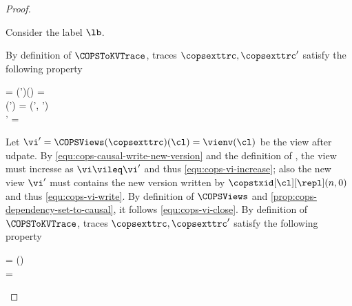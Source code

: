 \begin{proof}
\begin{enumerate}
    Consider the label \( \lb \).
    \begin{enumerate}
    \Case{\( \lb = \lbTrans{\vi,\Set{\opW(\key,\val)}}\)}
        By definition of \( \COPSToKVTrace \), traces \( \copsexttrc, \copsexttrc' \) satisfy the following property
        \begin{Formulae}
        \begin{Formula}
        \begin{multlined}
            \vi = \COPSViews(\copsexttrc')(\cl) 
            \land \copsexttrc = 
            \\ {} \land \LastConf(\copsexttrc') = (\cops', \copsctxenv')
            \\ {} \land \copsctxenv' = \copsctxenv{}
        \end{multlined}
        \label{equ:cops-causal-write-new-version}
        \end{Formula}
        \end{Formulae}
        Let \( \vi' = \COPSViews(\copsexttrc)(\cl) = \vienv(\cl) \) be the view after udpate.
        By \cref{equ:cops-causal-write-new-version} and the definition of \COPSViews, 
        the view must incresse as \(\vi \vileq \vi' \) and thus \cref{equ:cops-vi-increase};
        also the new view \( \vi' \) must contains the new version written by \(\copstxid[\cl][\repl](n,0) \)
        and thus \cref{equ:cops-vi-write}.
        By definition of \( \COPSViews\) and \cref{prop:cops-dependency-set-to-causal}, 
        it follows \cref{equ:cops-vi-close}.
        By definition of \( \COPSToKVTrace \), traces \( \copsexttrc, \copsexttrc' \) satisfy the following property
        \begin{Formulae}
        \begin{Formula}
        \begin{multlined}
            \vi = \vienv(\cl) 
            \\ {} \land \copsexttrc = 
\end{multlined}
\end{Formula}
\end{Formulae}
\end{enumerate}
\end{enumerate}
\end{proof}
